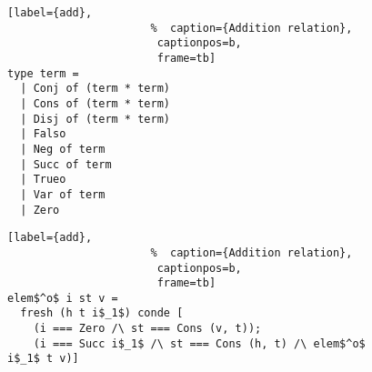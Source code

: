 \begin{figure}[!t]
  \centering
  \begin{minipage}{\columnwidth}
    \begin{lstlisting}[label={add},
                      %  caption={Addition relation},
                       captionpos=b,
                       frame=tb]
type term =
  | Conj of (term * term)
  | Cons of (term * term)
  | Disj of (term * term)
  | Falso
  | Neg of term
  | Succ of term
  | Trueo
  | Var of term
  | Zero
        \end{lstlisting}
  \end{minipage}
\end{figure}

\begin{figure}[!t]
  \centering
  \begin{minipage}{\columnwidth}
    \begin{lstlisting}[label={add},
                      %  caption={Addition relation},
                       captionpos=b,
                       frame=tb]
elem$^o$ i st v =
  fresh (h t i$_1$) conde [
    (i === Zero /\ st === Cons (v, t));
    (i === Succ i$_1$ /\ st === Cons (h, t) /\ elem$^o$ i$_1$ t v)]
      \end{lstlisting}
  \end{minipage}
\end{figure}
